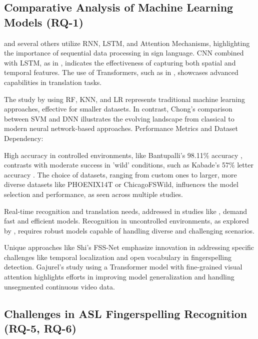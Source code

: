 \subsection{Comparative Analysis of Machine Learning Models (RQ-1)}

\cite{skumarTimeSeriesNeural2018} and several others utilize RNN, LSTM, and Attention Mechanisms, highlighting the importance of sequential data processing in sign language.
CNN combined with LSTM, as in \cite{shiAmericanSignLanguage2018}, indicates the effectiveness of capturing both spatial and temporal features.
The use of Transformers, such as in \cite{cihancamgozSignLanguageTransformers2020}, showcases advanced capabilities in translation tasks.

The study by \cite{weerasooriyaSinhalaFingerspellingSign2022} using RF, KNN, and LR represents traditional machine learning approaches, effective for smaller datasets.
In contrast, Chong's comparison \cite{chongAmericanSignLanguage2018} between SVM and DNN illustrates the evolving landscape from classical to modern neural network-based approaches.
Performance Metrics and Dataset Dependency:

High accuracy in controlled environments, like Bantupalli's 98.11\% accuracy \cite{bantupalliAmericanSignLanguage2018}, contrasts with moderate success in 'wild' conditions, such as Kabade's 57\% letter accuracy \cite{kabadeAmericanSignLanguage2023}.
The choice of datasets, ranging from custom ones to larger, more diverse datasets like PHOENIX14T or ChicagoFSWild, influences the model selection and performance, as seen across multiple studies.

Real-time recognition and translation needs, addressed in studies like \cite{abiyevReconstructionConvolutionalNeural2020}, demand fast and efficient models.
Recognition in uncontrolled environments, as explored by \cite{shiFingerspellingRecognitionWild2019}, requires robust models capable of handling diverse and challenging scenarios.

Unique approaches like Shi's FSS-Net \citep{shiSearchingFingerspelledContent2022} emphasize innovation in addressing specific challenges like temporal localization and open vocabulary in fingerspelling detection. Gajurel's study \citep{gajurelFineGrainedVisualAttention2021} using a Transformer model with fine-grained visual attention highlights efforts in improving model generalization and handling unsegmented continuous video data.

\subsection{Challenges in ASL Fingerspelling Recognition (RQ-5, RQ-6)}

